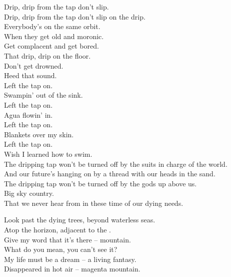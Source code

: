 Drip, drip from the tap don't slip. \\
Drip, drip from the tap don't slip on the drip. \\

Everybody's on the same orbit. \\
When they get old and moronic. \\
Get complacent and get bored. \\
That drip, drip on the floor. \\

Don't get drowned. \\
Heed that sound. \\

Left the tap on. \\
Swampin' out of the sink. \\
Left the tap on. \\
Agua flowin' in. \\
Left the tap on. \\
Blankets over my skin. \\
Left the tap on. \\
Wish I learned how to swim. \\

The dripping tap won't be turned off by the suits in charge of the world. \\
And our future's hanging on by a thread with our heads in the sand. \\
The dripping tap won't be turned off by the gods up above us. \\
Big sky country. \\
That we never hear from in these time of our dying needs. \\




Look past the dying trees, beyond waterless seas. \\
Atop the horizon, adjacent to the . \\
Give my word that it's there --  mountain. \\

What do you mean, you can't see it? \\
My life must be a dream -- a living fantasy. \\
Disappeared in hot air -- magenta mountain. \\

